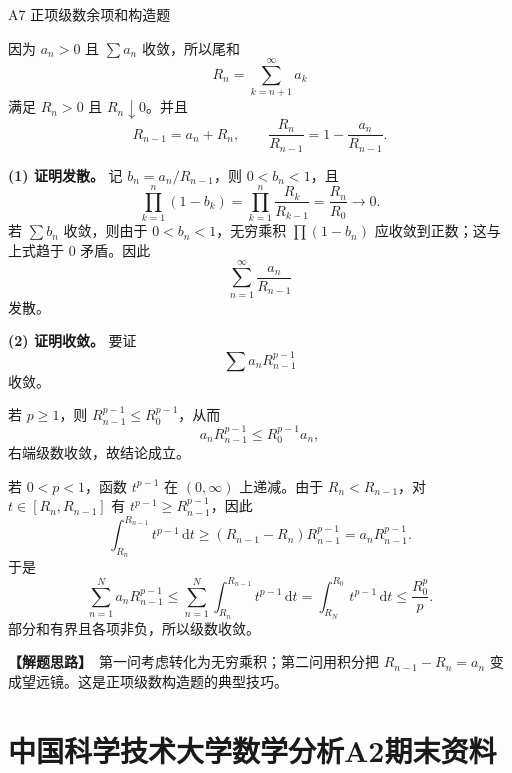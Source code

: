 \documentclass[UTF8,zihao=-4,openany]{ctexbook}
\newcommand{\dd}{\,\mathrm{d}}
\newcommand{\thinking}{\textcolor{mainblue}{\bfseries【解题思路】}}
\begin{document}
\begin{solutionbox}{A7 正项级数余项和构造题}

因为 $a_n>0$ 且 $\sum a_n$ 收敛，所以尾和
\[
R_n=\sum_{k=n+1}^{\infty}a_k
\]
满足 $R_n>0$ 且 $R_n\downarrow0$。并且
\[
R_{n-1}=a_n+R_n,
\qquad
\frac{R_n}{R_{n-1}}=1-\frac{a_n}{R_{n-1}}.
\]

\textbf{(1) 证明发散。} 记 $b_n=a_n/R_{n-1}$，则 $0<b_n<1$，且
\[
\prod_{k=1}^{n}(1-b_k)=\prod_{k=1}^{n}\frac{R_k}{R_{k-1}}=\frac{R_n}{R_0}\to0.
\]
若 $\sum b_n$ 收敛，则由于 $0<b_n<1$，无穷乘积 $\prod(1-b_n)$ 应收敛到正数；这与上式趋于 $0$ 矛盾。因此
\[
\sum_{n=1}^{\infty}\frac{a_n}{R_{n-1}}
\]
发散。

\textbf{(2) 证明收敛。} 要证
\[
\sum a_nR_{n-1}^{p-1}
\]
收敛。

若 $p\ge1$，则 $R_{n-1}^{p-1}\le R_0^{p-1}$，从而
\[
a_nR_{n-1}^{p-1}\le R_0^{p-1}a_n,
\]
右端级数收敛，故结论成立。

若 $0<p<1$，函数 $t^{p-1}$ 在 $(0,\infty)$ 上递减。由于 $R_n<R_{n-1}$，对 $t\in[R_n,R_{n-1}]$ 有 $t^{p-1}\ge R_{n-1}^{p-1}$，因此
\[
\int_{R_n}^{R_{n-1}}t^{p-1}\dd t\ge (R_{n-1}-R_n)R_{n-1}^{p-1}=a_nR_{n-1}^{p-1}.
\]
于是
\[
\sum_{n=1}^{N}a_nR_{n-1}^{p-1}
\le\sum_{n=1}^{N}\int_{R_n}^{R_{n-1}}t^{p-1}\dd t
=\int_{R_N}^{R_0}t^{p-1}\dd t
\le \frac{R_0^p}{p}.
\]
部分和有界且各项非负，所以级数收敛。

\thinking\ 第一问考虑转化为无穷乘积；第二问用积分把 $R_{n-1}-R_n=a_n$ 变成望远镜。这是正项级数构造题的典型技巧。
\end{solutionbox}

\chapter{中国科学技术大学数学分析A2期末资料}
\end{document}
